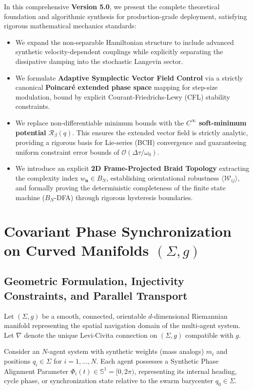 \documentclass[11pt,a4paper,reqno]{article}
\theoremstyle{plain}
\theoremstyle{definition}
\theoremstyle{remark}
\numberwithin{equation}{section}
\begin{document}
In this comprehensive \textbf{Version 5.0}, we present the complete theoretical foundation and algorithmic synthesis for production-grade deployment, satisfying rigorous mathematical mechanics standards:
\begin{itemize}
    \item We expand the non-separable Hamiltonian structure to include advanced synthetic velocity-dependent couplings while explicitly separating the dissipative damping into the stochastic Langevin sector.
    \item We formulate \textbf{Adaptive Symplectic Vector Field Control} via a strictly canonical \textbf{Poincaré extended phase space} mapping for step-size modulation, bound by explicit Courant-Friedrichs-Lewy (CFL) stability constraints.
    \item We replace non-differentiable minimum bounds with the \textbf{$C^\infty$ soft-minimum potential $\mathcal{R}_\beta(q)$}. This ensures the extended vector field is strictly analytic, providing a rigorous basis for Lie-series (BCH) convergence and guaranteeing uniform constraint error bounds of $\mathcal{O}(\Delta \tau / \omega_0)$.
    \item We introduce an explicit \textbf{2D Frame-Projected Braid Topology} extracting the complexity index $w_{\mathbf{n}} \in B_N$, establishing orientational robustness $\langle \mathcal{W}_{ij} \rangle$, and formally proving the deterministic completeness of the finite state machine ($B_N$-DFA) through rigorous hysteresis boundaries.
\end{itemize}

\bigskip

\section{Covariant Phase Synchronization on Curved Manifolds \texorpdfstring{$(\Sigma, g)$}{(Sigma, g)}}

\subsection{Geometric Formulation, Injectivity Constraints, and Parallel Transport}
Let $(\Sigma, g)$ be a smooth, connected, orientable $d$-dimensional Riemannian manifold representing the spatial navigation domain of the multi-agent system. Let $\nabla$ denote the unique Levi-Civita connection on $(\Sigma, g)$ compatible with $g$.

Consider an $N$-agent system with synthetic weights (mass analogs) $m_i$ and positions $q_i \in \Sigma$ for $i = 1, \dots, N$. Each agent possesses a Synthetic Phase Alignment Parameter $\Phi_i(t) \in \mathbb{S}^1 = [0, 2\pi)$, representing its internal heading, cycle phase, or synchronization state relative to the swarm barycenter $q_0 \in \Sigma$.
\end{document}
